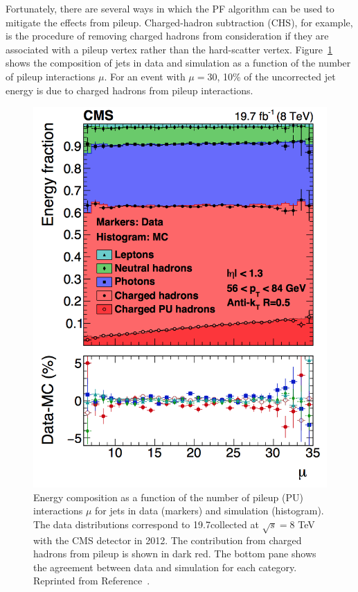 Fortunately, there are several ways in which the PF algorithm can be used to mitigate the effects from pileup. Charged-hadron subtraction (CHS), for example, is the procedure of removing charged hadrons from consideration if they are associated with a pileup vertex rather than the hard-scatter vertex. Figure~\ref{fig:jetComp} shows the composition of jets in data and simulation as a function of the number of pileup interactions $\mu$. For an event with $\mu = 30$, 10\% of the uncorrected jet energy is due to charged hadrons from pileup interactions. 

 \begin{figure}[h!]
	\centering
	\includegraphics[width=0.8\linewidth]{Figures/EventReconstruction/jetComp.png}
       \caption[Energy composition as a function of the number of pileup interactions for jets in 
       data and simulation.]
       {Energy composition as a function of the number of pileup (PU) interactions $\mu$ for jets in 
       data (markers) and simulation (histogram). The data distributions correspond to 19.7\fbinv collected at 
       $\sqrt{s} = 8$ TeV with the CMS detector in 2012.
       The contribution from charged hadrons from pileup is shown in dark red.
       The bottom pane shows the agreement between data and simulation for each category.
       Reprinted from Reference~\cite{ParticleFlow}.}
       \label{fig:jetComp}
\end{figure}

